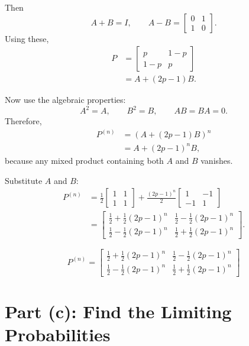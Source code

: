 \documentclass[11pt]{article}
\begin{document}
Then
\[
    A+B = I,
    \qquad
    A-B=
    \begin{bmatrix}
        0 & 1\\
        1 & 0
    \end{bmatrix}.
\]
Using these,
\[
\begin{aligned}
    P
    &=
    \begin{bmatrix}
        p & 1-p\\
        1-p & p
    \end{bmatrix} \\
    &=
    A + (2p-1)B.
\end{aligned}
\]

Now use the algebraic properties:
\[
    A^2=A,\qquad B^2=B,\qquad AB=BA=0.
\]
Therefore,
\[
\begin{aligned}
    P^{(n)}
    &=
    \left(A+(2p-1)B\right)^n \\
    &=
    A + (2p-1)^n B,
\end{aligned}
\]
because any mixed product containing both \(A\) and \(B\) vanishes.

Substitute \(A\) and \(B\):
\[
\begin{aligned}
    P^{(n)}
    &=
    \frac12
    \begin{bmatrix}
        1 & 1\\
        1 & 1
    \end{bmatrix}
    +
    \frac{(2p-1)^n}{2}
    \begin{bmatrix}
        1 & -1\\
        -1 & 1
    \end{bmatrix} \\
    &=
    \begin{bmatrix}
        \frac12+\frac12(2p-1)^n & \frac12-\frac12(2p-1)^n \\
        \frac12-\frac12(2p-1)^n & \frac12+\frac12(2p-1)^n
    \end{bmatrix}.
\end{aligned}
\]

\[
    \boxed{
    P^{(n)}
    =
    \begin{bmatrix}
        \frac12+\frac12(2p-1)^n & \frac12-\frac12(2p-1)^n \\
        \frac12-\frac12(2p-1)^n & \frac12+\frac12(2p-1)^n
    \end{bmatrix}
    }
\]

\section*{Part (c): Find the Limiting Probabilities}
\end{document}
